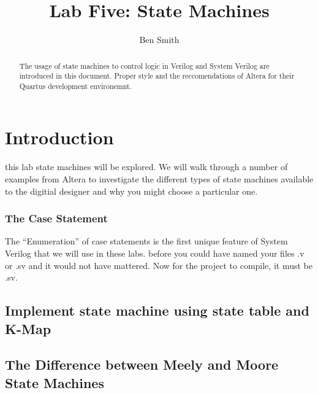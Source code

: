 \title{Lab Five: State Machines}
\author{Ben Smith}




  \maketitle
    \begin{abstract}
      The usage of state machines to control logic in Verilog and System Verilog are introduced in this document. Proper style and the reccomendations of Altera for their Quartus development environemnt.
    \end{abstract}
\section{ Introduction}
   this lab state machines will be explored. We will walk through a number of examples from Altera to investigate the different types of state machines available to the digitial designer and why you might choose a particular one.

    \subsubsection{The Case Statement}
     The ``Enumeration'' of case statements is the first unique feature of System Verilog that we will use in these labs. before you could have named your files .v or .sv and it would not have mattered. Now for the project to compile, it must be .sv.

  \subsection{Implement state machine using state table and K-Map}

  \subsection{The Difference between Meely and Moore State Machines}

